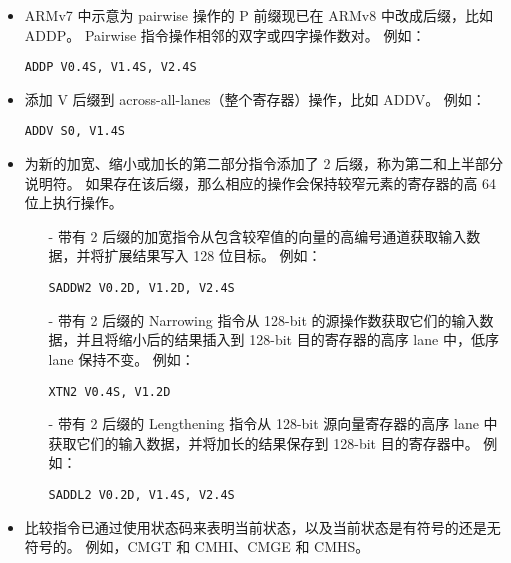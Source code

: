 \begin{itemize}
  \item ARMv7 中示意为 pairwise 操作的 P 前缀现已在 ARMv8 中改成后缀，比如 ADDP。
    Pairwise 指令操作相邻的双字或四字操作数对。
    例如：

    \lstinline!ADDP V0.4S, V1.4S, V2.4S!


  \item 添加 V 后缀到 across-all-lanes（整个寄存器）操作，比如 ADDV。
    例如：

    \lstinline!ADDV S0, V1.4S!


  \item 为新的加宽、缩小或加长的第二部分指令添加了 2 后缀，称为第二和上半部分说明符。
    如果存在该后缀，那么相应的操作会保持较窄元素的寄存器的高 64 位上执行操作。

    \begin{itemize}
      \item[-] 带有 2 后缀的加宽指令从包含较窄值的向量的高编号通道获取输入数据，并将扩展结果写入 128 位目标。
        例如：

        \lstinline!SADDW2 V0.2D, V1.2D, V2.4S!


      \item[-] 带有 2 后缀的 Narrowing 指令从 128-bit 的源操作数获取它们的输入数据，并且将缩小后的结果插入到 128-bit 目的寄存器的高序 lane 中，低序 lane 保持不变。
        例如：

        \lstinline!XTN2 V0.4S, V1.2D!


      \item[-] 带有 2 后缀的 Lengthening 指令从 128-bit 源向量寄存器的高序 lane 中获取它们的输入数据，并将加长的结果保存到 128-bit 目的寄存器中。
        例如：

        \lstinline!SADDL2 V0.2D, V1.4S, V2.4S!

    \end{itemize}

  \item 比较指令已通过使用状态码来表明当前状态，以及当前状态是有符号的还是无符号的。
    例如，CMGT 和 CMHI、CMGE 和 CMHS。

\end{itemize}

